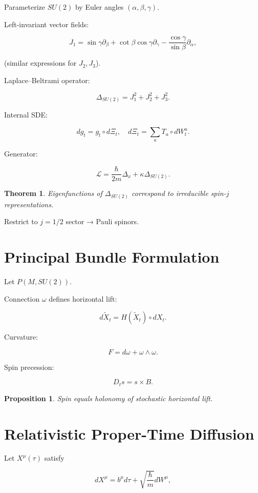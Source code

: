 \documentclass[12pt]{article}
\newtheorem{theorem}{Theorem}
\newtheorem{proposition}{Proposition}
\begin{document}
Parameterize $SU(2)$ by Euler angles $(\alpha,\beta,\gamma)$.

Left-invariant vector fields:

\[
J_1 = \sin\gamma \partial_\beta
+ \cot\beta\cos\gamma\partial_\gamma
- \frac{\cos\gamma}{\sin\beta}\partial_\alpha,
\]

(similar expressions for $J_2,J_3$).

Laplace–Beltrami operator:

\[
\Delta_{SU(2)} = J_1^2+J_2^2+J_3^2.
\]

Internal SDE:

\[
dg_t = g_t \circ d\Xi_t,
\quad
d\Xi_t = \sum_a T_a \circ dW_t^a.
\]

Generator:

\[
\mathcal{L} =
\frac{\hbar}{2m}\Delta_x
+
\kappa\Delta_{SU(2)}.
\]

\begin{theorem}
Eigenfunctions of $\Delta_{SU(2)}$ correspond to
irreducible spin-$j$ representations.
\end{theorem}

Restrict to $j=1/2$ sector → Pauli spinors.

\section{Principal Bundle Formulation}

Let $P(M,SU(2))$.

Connection $\omega$ defines horizontal lift:

\[
d\tilde{X}_t
=
H(\tilde{X}_t)\circ dX_t.
\]

Curvature:

\[
F = d\omega + \omega\wedge\omega.
\]

Spin precession:

\[
D_t s = s \times B.
\]

\begin{proposition}
Spin equals holonomy of stochastic horizontal lift.
\end{proposition}

\section{Relativistic Proper-Time Diffusion}

Let $X^\mu(\tau)$ satisfy

\[
dX^\mu = b^\mu d\tau
+ \sqrt{\frac{\hbar}{m}} dW^\mu,
\]
\end{document}
